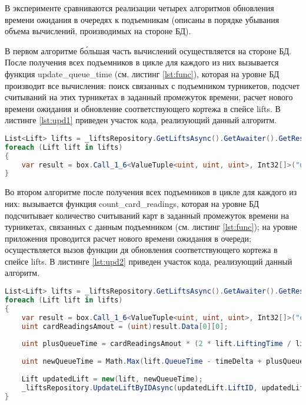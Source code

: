 В эксперименте сравниваются реализации четырех алгоритмов обновления времени ожидания в очередях к подъемникам (описаны в порядке убывания объема вычислений, производимых на стороне БД).

В первом алгоритме б\'{о}льшая часть вычислений осуществляется на стороне БД. После получения всех подъемников в цикле для каждого из них вызывается функция update\_queue\_time (см. листинг \ref{lst:func}), которая на уровне БД производит все вычисления: поиск связанных с подъемником турникетов, подсчет считываний на этих турникетах в заданный промежуток времени,  расчет нового времени ожидания и обновление соответствующего кортежа в спейсе lifts. В листинге \ref{lst:upd1} приведен участок кода, реализующий данный алгоритм.

\captionsetup{justification=centering,singlelinecheck=off}
\begin{lstlisting}[label=lst:upd1, caption=Первый алгоритм обновления времени ожидания в очередях к подъемникам, language=csharp]
List<Lift> lifts = _liftsRepository.GetLiftsAsync().GetAwaiter().GetResult(); 
foreach (Lift lift in lifts)
{
	var result = box.Call_1_6<ValueTuple<uint, uint, uint>, Int32[]>("update_queue_time", (ValueTuple.Create(lift.LiftID, (uint)dateFrom.ToUnixTimeSeconds(), (uint)dateTo.ToUnixTimeSeconds()))).GetAwaiter().GetResult();
}
\end{lstlisting}

Во втором алгоритме после получения всех подъемников в цикле для каждого из них: вызывается функция count\_card\_readings, которая на уровне БД подсчитывает количество считываний карт в заданный промежуток времени на турникетах, связанных с данным подъемником (см. листинг \ref{lst:func}); на уровне приложения проводится расчет нового времени ожидания в очереди; осуществляется вызов функции дя обновления соответствующего кортежа в спейсе lifts. В листинге \ref{lst:upd2} приведен участок кода, реализующий данный алгоритм.

\captionsetup{justification=centering,singlelinecheck=off}
\begin{lstlisting}[label=lst:upd2, caption=Второй алгоритм обновления времени ожидания в очередях к подъемникам, language=csharp]
List<Lift> lifts = _liftsRepository.GetLiftsAsync().GetAwaiter().GetResult();
foreach (Lift lift in lifts)
{
	var result = box.Call_1_6<ValueTuple<uint, uint, uint>, Int32[]>("count_card_readings", (ValueTuple.Create(lift.LiftID, (uint)dateFrom.ToUnixTimeSeconds(), (uint)dateTo.ToUnixTimeSeconds()))).GetAwaiter().GetResult();
	uint cardReadingsAmout = (uint)result.Data[0][0];
	
	uint plusQueueTime = cardReadingsAmout * (2 * lift.LiftingTime / lift.SeatsAmount);
	
	uint newQueueTime = Math.Max(lift.QueueTime - timeDelta + plusQueueTime, 0);
	
	Lift updatedLift = new(lift, newQueueTime);
	_liftsRepository.UpdateLiftByIDAsync(updatedLift.LiftID, updatedLift.LiftName, updatedLift.IsOpen, updatedLift.SeatsAmount, updatedLift.LiftingTime).GetAwaiter().GetResult();
}
\end{lstlisting}


